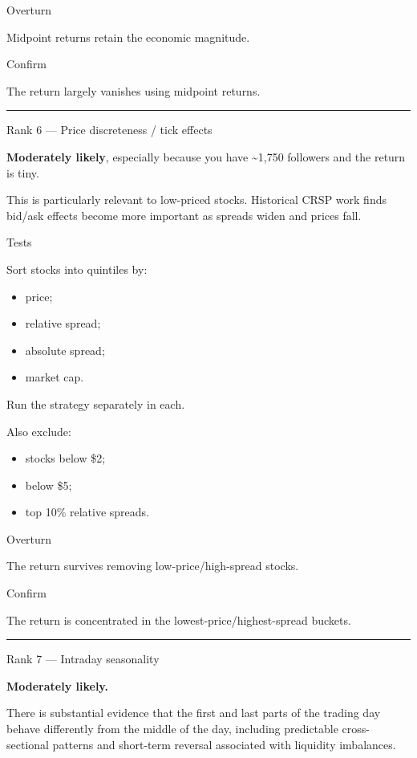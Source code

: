 Overturn

Midpoint returns retain the economic magnitude.

Confirm

The return largely vanishes using midpoint returns.

\begin{center}\rule{0.5\linewidth}{0.5pt}\end{center}

Rank 6 --- Price discreteness / tick effects

\textbf{Moderately likely}, especially because you have \textasciitilde1,750 followers and the return is tiny.

This is particularly relevant to low-priced stocks. Historical CRSP work finds bid/ask effects become more important as spreads widen and prices fall.

Tests

Sort stocks into quintiles by:

\begin{itemize}
\tightlist
\item
  price;
\item
  relative spread;
\item
  absolute spread;
\item
  market cap.
\end{itemize}

Run the strategy separately in each.

Also exclude:

\begin{itemize}
\tightlist
\item
  stocks below \$2;
\item
  below \$5;
\item
  top 10\% relative spreads.
\end{itemize}

Overturn

The return survives removing low-price/high-spread stocks.

Confirm

The return is concentrated in the lowest-price/highest-spread buckets.

\begin{center}\rule{0.5\linewidth}{0.5pt}\end{center}

Rank 7 --- Intraday seasonality

\textbf{Moderately likely.}

There is substantial evidence that the first and last parts of the trading day behave differently from the middle of the day, including predictable cross-sectional patterns and short-term reversal associated with liquidity imbalances.

